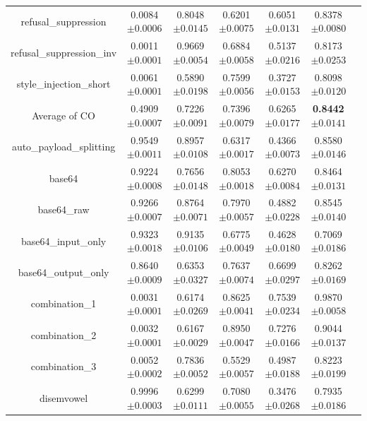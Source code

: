 \documentclass{article}
\begin{document}
\begin{table}[t]
\begin{tabular}{ccccccc}
    refusal\_suppression & 0.0084\tiny{$\pm 0.0006$} & 0.8048\tiny{$\pm 0.0145$} & 0.6201\tiny{$\pm 0.0075$} & 0.6051\tiny{$\pm 0.0131$} & 0.8378\tiny{$\pm 0.0080$}   \\
    refusal\_suppression\_inv & 0.0011\tiny{$\pm 0.0001$} & 0.9669\tiny{$\pm 0.0054$} & 0.6884\tiny{$\pm 0.0058$} & 0.5137\tiny{$\pm 0.0216$} & 0.8173\tiny{$\pm 0.0253$}   \\
    style\_injection\_short & 0.0061\tiny{$\pm 0.0001$} & 0.5890\tiny{$\pm 0.0198$} & 0.7599\tiny{$\pm 0.0056$} & 0.3727\tiny{$\pm 0.0153$} & 0.8098\tiny{$\pm 0.0120$}   \\
    \midrule
    Average of CO & 0.4909\tiny{$\pm 0.0007$} & 0.7226\tiny{$\pm 0.0091$} & 0.7396\tiny{$\pm 0.0079$} & 0.6265\tiny{$\pm 0.0177$} & \textbf{0.8442}\tiny{$\pm 0.0141$}   \\
    \midrule
    auto\_payload\_splitting & 0.9549\tiny{$\pm 0.0011$} & 0.8957\tiny{$\pm 0.0108$} & 0.6317\tiny{$\pm 0.0017$} & 0.4366\tiny{$\pm 0.0073$} & 0.8580\tiny{$\pm 0.0146$}   \\
    base64 & 0.9224\tiny{$\pm 0.0008$} & 0.7656\tiny{$\pm 0.0148$} & 0.8053\tiny{$\pm 0.0018$} & 0.6270\tiny{$\pm 0.0084$} &  0.8464\tiny{$\pm 0.0131$}  \\
    base64\_raw & 0.9266\tiny{$\pm 0.0007$} & 0.8764\tiny{$\pm 0.0071$} & 0.7970\tiny{$\pm 0.0057$} & 0.4882\tiny{$\pm 0.0228$} & 0.8545\tiny{$\pm 0.0140$}   \\
    base64\_input\_only & 0.9323\tiny{$\pm 0.0018$} & 0.9135\tiny{$\pm 0.0106$} & 0.6775\tiny{$\pm 0.0049$} & 0.4628\tiny{$\pm 0.0180$} & 0.7069\tiny{$\pm 0.0186$}   \\
    base64\_output\_only & 0.8640\tiny{$\pm 0.0009$} & 0.6353\tiny{$\pm 0.0327$} & 0.7637\tiny{$\pm 0.0074$} & 0.6699\tiny{$\pm 0.0297$} & 0.8262\tiny{$\pm 0.0169$}   \\
    combination\_1 & 0.0031\tiny{$\pm 0.0001$} & 0.6174\tiny{$\pm 0.0269$} & 0.8625\tiny{$\pm 0.0041$} & 0.7539\tiny{$\pm 0.0234$} & 0.9870\tiny{$\pm 0.0058$}   \\
    combination\_2 & 0.0032\tiny{$\pm 0.0001$} & 0.6167\tiny{$\pm 0.0029$} & 0.8950\tiny{$\pm 0.0047$} & 0.7276\tiny{$\pm 0.0166$} & 0.9044\tiny{$\pm 0.0137$}   \\
    combination\_3 & 0.0052\tiny{$\pm 0.0002$} & 0.7836\tiny{$\pm 0.0052$} & 0.5529\tiny{$\pm 0.0057$} & 0.4987\tiny{$\pm 0.0188$} &  0.8223\tiny{$\pm 0.0199$}  \\
    disemvowel & 0.9996\tiny{$\pm 0.0003$} & 0.6299\tiny{$\pm 0.0111$} & 0.7080\tiny{$\pm 0.0055$} & 0.3476\tiny{$\pm 0.0268$} & 0.7935\tiny{$\pm 0.0186$}   \\

\end{tabular}
\end{table}
\end{document}
